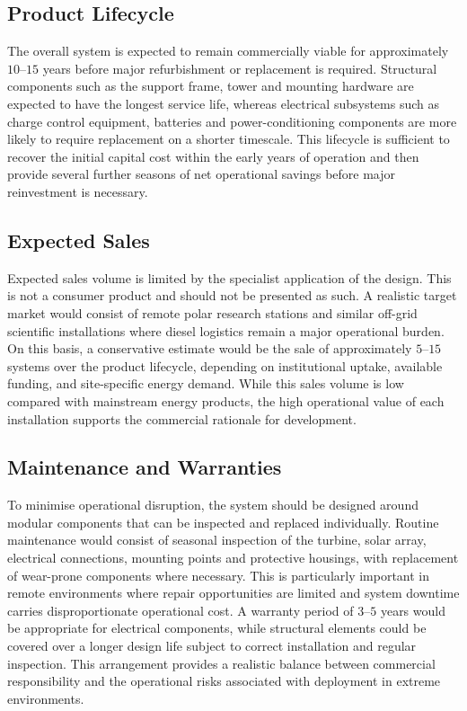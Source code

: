 \documentclass[11pt,a4paper]{article}
\begin{document}
\subsection{Product Lifecycle}

The overall system is expected to remain commercially viable for
approximately $10$--$15$ years before major refurbishment or replacement is
required. Structural components such as the support frame, tower and mounting
hardware are expected to have the longest service life, whereas electrical
subsystems such as charge control equipment, batteries and power-conditioning
components are more likely to require replacement on a shorter timescale.
This lifecycle is sufficient to recover the initial capital cost within the
early years of operation and then provide several further seasons of net
operational savings before major reinvestment is necessary.

\subsection{Expected Sales}

Expected sales volume is limited by the specialist application of the design.
This is not a consumer product and should not be presented as such. A
realistic target market would consist of remote polar research stations and
similar off-grid scientific installations where diesel logistics remain a
major operational burden. On this basis, a conservative estimate would be the
sale of approximately $5$--$15$ systems over the product lifecycle,
depending on institutional uptake, available funding, and site-specific
energy demand. While this sales volume is low compared with mainstream energy
products, the high operational value of each installation supports the
commercial rationale for development.

\subsection{Maintenance and Warranties}

To minimise operational disruption, the system should be designed around
modular components that can be inspected and replaced individually. Routine
maintenance would consist of seasonal inspection of the turbine, solar array,
electrical connections, mounting points and protective housings, with
replacement of wear-prone components where necessary. This is particularly
important in remote environments where repair opportunities are limited and
system downtime carries disproportionate operational cost. A warranty period
of $3$--$5$ years would be appropriate for electrical components, while
structural elements could be covered over a longer design life subject to
correct installation and regular inspection. This arrangement provides a
realistic balance between commercial responsibility and the operational risks
associated with deployment in extreme environments.
\end{document}
